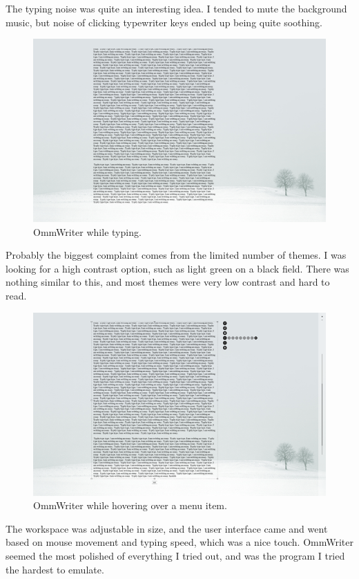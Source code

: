 \documentclass[10pt]{article}
\begin{document}
The typing noise was quite an interesting idea. I tended to mute the background music, but noise of clicking typewriter keys ended up being quite soothing.

\begin{figure}
   \centering
      \includegraphics[width=130mm]{images/ommwriter2.png}
   \caption{OmmWriter while typing.}
\end{figure}

Probably the biggest complaint comes from the limited number of themes. I was looking for a high contrast option, such as light green on a black field. There was nothing similar to this, and most themes were very low contrast and hard to read.

\begin{figure}
   \centering
      \includegraphics[width=130mm]{images/ommwriter3.png}
   \caption{OmmWriter while hovering over a menu item.}
\end{figure}

The workspace was adjustable in size, and the user interface came and went based on mouse movement and typing speed, which was a nice touch. OmmWriter seemed the most polished of everything I tried out, and was the program I tried the hardest to emulate.
\end{document}
